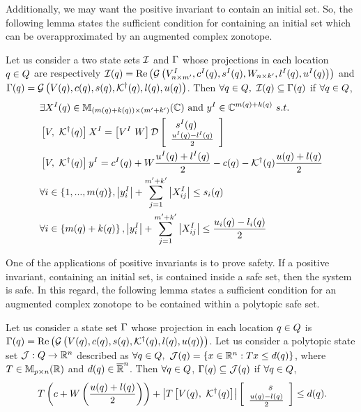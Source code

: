 Additionally, we may want the positive invariant to contain an initial
set.  So, the following lemma states the sufficient condition for
containing an initial set which can be overapproximated by an
augmented complex zonotope.
\begin{lemma}
  Let us consider a two state sets $\mathcal{I}$ and $\Gamma$ whose projections in each location
  $q\in Q$ are respectively $\mathcal{I}(q)=\operatorname{\operatorname{Re}}\left(\mathcal{G}\left(V^I_{n\times
      m^\prime },c^I(q),s^I(q),W_{n\times
      k^\prime},l^I(q),u^I(q)\right)\right)$ and $\Gamma(q) =
  \mathcal{G}\left(V(q),c(q),s(q),\mathcal{K}^\dagger(q),l(q),u(q)\right)$.
  Then
  $\forall q\in Q,~\mathcal{I}(q)\subseteq \Gamma(q)$
  if $\forall q\in Q$, 
\begin{align}
\begin{split}
& \exists X^I(q)\in\mathbb{M}_{(m(q)+k(q))\times (m^\prime+k^\prime)}(\mathbb{\mathbb{C}})~\text{and}~y^I\in\mathbb{C}^{m(q)+k(q)}~s.t.\\
& \left[V,~\mathcal{K}^\dagger(q)\right]X^I = \left[V^I~W\right]\mathcal{D}\left[\begin{array}{l}{\hspace{0.5em}s^I(q)}\\{\frac{u^I(q)-l^I(q)}{2}} \end{array}\right]\\
& \left[V,~\mathcal{K}^\dagger(q)\right]y^I =
c^I(q)+W\frac{u^I(q)+l^I(q)}{2}-c(q)-\mathcal{K}^\dagger(q)\frac{u(q)+l(q)}{2}\\
& \forall i\in\{1,...,m(q)\},
\left|y_i^I\right|+\sum_{j=1}^{m^\prime+k^\prime}\left|X_{ij}^I\right|\leq s_i(q)\\
& \forall
i\in\left\{m(q)+k(q)\right\},\left|y_i^I\right|+\sum_{j=1}^{m^\prime+k^\prime}\left|X_{ij}^I\right|\leq \frac{u_i(q)-l_i(q)}{2}
\end{split}
\end{align}
\end{lemma}

One of the applications of positive invariants is to prove safety.  If
a positive invariant, containing an initial set, is contained inside a
safe set, then the system is safe.  In this regard, the following
lemma states a sufficient condition for an augmented complex zonotope
to be contained within a polytopic safe set.

\begin{lemma}
  Let us consider a state set $\Gamma$ whose projection in each
  location $q \in Q$ is $\Gamma(q) =
  \operatorname{\operatorname{Re}}\left(\mathcal{G}\left(V(q),c(q),s(q),\mathcal{K}^\dagger(q),l(q),u(q)\right)\right)$.
  Let us consider a polytopic state set
  $\mathcal{J}:Q\rightarrow\mathbb{R}^n$ described as $\forall
  q\in Q,~\mathcal{J}(q)=\left\{x\in\mathbb{R}^n:Tx\leq
  d(q)\right\}$, where $T\in\mathbb{M}_{p\times n}(\mathbb{R})$ and
  $d(q)\in\mathbb{\overline{R}}^n$.  Then $\forall q\in Q$,
  $\Gamma(q)\subseteq \mathcal{J}(q)$ if $\forall
  q\in Q$,
\begin{align}~\label{eqn:safe-contain}
T\left(c+W\left(\frac{u(q)+l(q)}{2}\right)\right)+\left|T\left[V(q),~\mathcal{K}^\dagger(q)\right]\right|\left[\begin{array}{l}{\hspace{2em}s}\\{\frac{u(q)-l(q)}{2}} \end{array}\right]\leq d(q).
\end{align}
\end{lemma}

